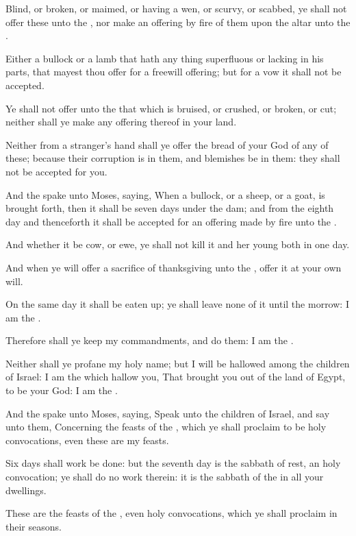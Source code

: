 \Verse Blind, or broken, or maimed, or having a wen, or scurvy, or scabbed, ye shall not offer these unto the \LORD, nor make an offering by fire of them upon the altar unto the \LORD.

\Verse Either a bullock or a lamb that hath any thing superfluous or lacking in his parts, that mayest thou offer for a freewill offering; but for a vow it shall not be accepted.

\Verse Ye shall not offer unto the \LORD that which is bruised, or crushed, or broken, or cut; neither shall ye make any offering thereof in your land.

\Verse Neither from a stranger's hand shall ye offer the bread of your God of any of these; because their corruption is in them, and blemishes be in them: they shall not be accepted for you.

\Verse And the \LORD spake unto Moses, saying, \Verse When a bullock, or a sheep, or a goat, is brought forth, then it shall be seven days under the dam; and from the eighth day and thenceforth it shall be accepted for an offering made by fire unto the \LORD.

\Verse And whether it be cow, or ewe, ye shall not kill it and her young both in one day.

\Verse And when ye will offer a sacrifice of thanksgiving unto the \LORD, offer it at your own will.

\Verse On the same day it shall be eaten up; ye shall leave none of it until the morrow: I am the \LORD.

\Verse Therefore shall ye keep my commandments, and do them: I am the \LORD.

\Verse Neither shall ye profane my holy name; but I will be hallowed among the children of Israel: I am the \LORD which hallow you, \Verse That brought you out of the land of Egypt, to be your God: I am the \LORD.

\Chapter
\Verse And the \LORD spake unto Moses, saying, \Verse Speak unto the children of Israel, and say unto them, Concerning the feasts of the \LORD, which ye shall proclaim to be holy convocations, even these are my feasts.

\Verse Six days shall work be done: but the seventh day is the sabbath of rest, an holy convocation; ye shall do no work therein: it is the sabbath of the \LORD in all your dwellings.

\Verse These are the feasts of the \LORD, even holy convocations, which ye shall proclaim in their seasons.

